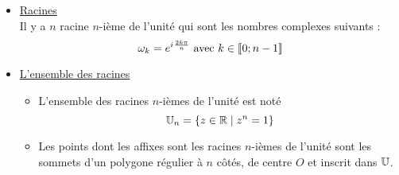 \begin{defprop}[Cas particulier où \(z_0 = 1\)]
    \begin{itemize}
        \item \underline{Racines} \\
        Il y a \(n\) racine \(n\)-ième de l'unité qui sont les nombres complexes suivants : 
        \[\omega_k = e^{i\mkern1mu\frac{2k\pi}{n}} \text{ avec } k \in \left\llbracket0;n-1\right\rrbracket\] 
        \item \underline{L'ensemble des racines} \\
        \begin{itemize}
            \item L'ensemble des racines \(n\)-ièmes de l'unité est noté 
            \[\mathbb{U}_n = \left\lbrace z\in\mathbb{R} \;\middle|\; z^n = 1\right\rbrace\]
            \item Les points dont les affixes sont les racines \(n\)-ièmes de l’unité sont les sommets d’un polygone régulier à \(n\) côtés, de centre \(O\) et inscrit dans \(\mathbb{U}\).
        \end{itemize}
    \end{itemize}
\end{defprop}
